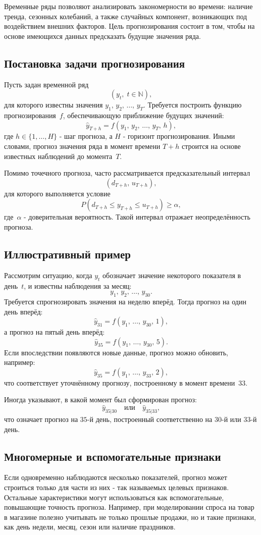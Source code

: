 \documentclass[12pt,a4paper]{article}
\begin{document}
Временные ряды позволяют анализировать закономерности во времени: наличие тренда, сезонных колебаний, а также случайных компонент, возникающих под воздействием внешних факторов. Цель прогнозирования состоит в том, чтобы на основе имеющихся данных предсказать будущие значения ряда.

\subsection{Постановка задачи прогнозирования}
Пусть задан временной ряд
\[
(y_t,\; t\in\mathbb{N}),
\]
для которого известны значения $y_1,\,y_2,\,\ldots,\,y_T$.
Требуется построить функцию прогнозирования~$f$, обеспечивающую приближение будущих значений:
\[
\hat{y}_{T+h}=f(y_1,\,y_2,\,\ldots,\,y_T,\,h),
\]
где $h\in\{1,\ldots,H\}$ - шаг прогноза, а $H$ - горизонт прогнозирования.
Иными словами, прогноз значения ряда в момент времени $T+h$ строится на основе известных наблюдений до момента~$T$.

Помимо точечного прогноза, часто рассматривается предсказательный интервал
\[
(d_{T+h},\,u_{T+h}),
\]
для которого выполняется условие
\[
P\!\left(d_{T+h}\le y_{T+h}\le u_{T+h}\right)\ge \alpha,
\]
где~$\alpha$ - доверительная вероятность. Такой интервал отражает неопределённость прогноза.

\subsection{Иллюстративный пример}
Рассмотрим ситуацию, когда $y_t$ обозначает значение некоторого показателя в день~$t$, и известны наблюдения за месяц:
\[
y_1,\,y_2,\,\ldots,\,y_{30}.
\]
Требуется спрогнозировать значения на неделю вперёд.
Тогда прогноз на один день вперёд:
\[
\hat{y}_{31}=f(y_1,\,\ldots,\,y_{30},\,1),
\]
а прогноз на пятый день вперёд:
\[
\hat{y}_{35}=f(y_1,\,\ldots,\,y_{30},\,5).
\]
Если впоследствии появляются новые данные, прогноз можно обновить, например:
\[
\hat{y}_{35}=f(y_1,\,\ldots,\,y_{33},\,2),
\]
что соответствует уточнённому прогнозу, построенному в момент времени~$33$.

Иногда указывают, в какой момент был сформирован прогноз:
\[
\hat{y}_{35|30} \quad\text{или}\quad \hat{y}_{35|33},
\]
что означает прогноз на $35$-й день, построенный соответственно на $30$-й или $33$-й день.

\subsection{Многомерные и вспомогательные признаки}
Если одновременно наблюдаются несколько показателей, прогноз может строиться только для части из них - так называемых целевых признаков. Остальные характеристики могут использоваться как вспомогательные, повышающие точность прогноза.
Например, при моделировании спроса на товар в магазине полезно учитывать не только прошлые продажи, но и такие признаки, как день недели, месяц, сезон или наличие праздников.
\end{document}
